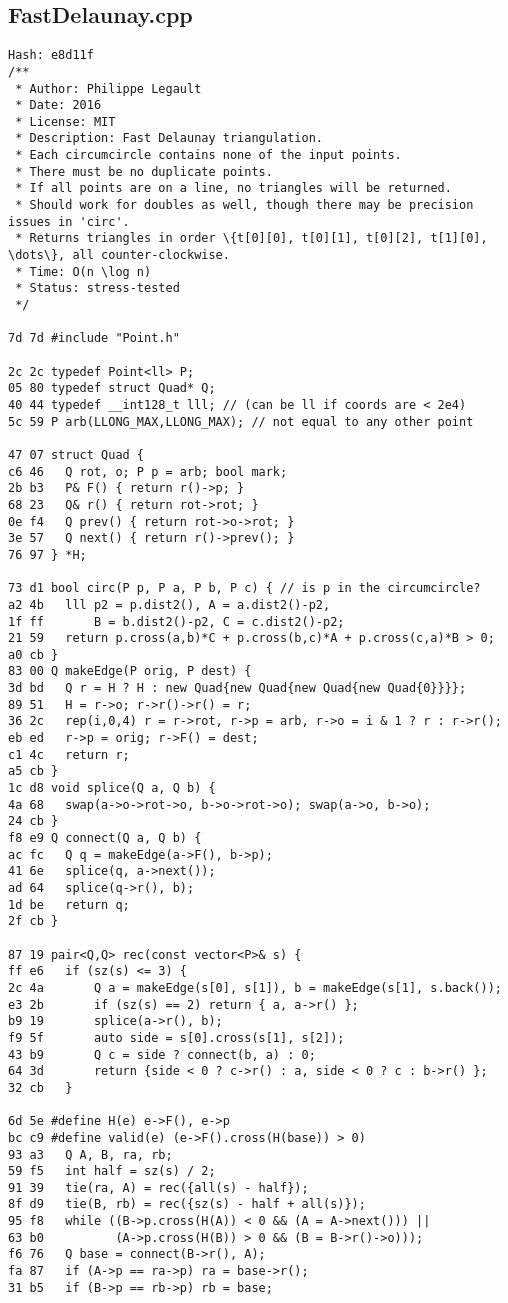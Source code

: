 \documentclass[11pt, a4paper, twoside]{article}
\begin{document}
\subsection{FastDelaunay.cpp}
\begin{lstlisting}
Hash: e8d11f
/**
 * Author: Philippe Legault
 * Date: 2016
 * License: MIT
 * Description: Fast Delaunay triangulation.
 * Each circumcircle contains none of the input points.
 * There must be no duplicate points.
 * If all points are on a line, no triangles will be returned.
 * Should work for doubles as well, though there may be precision issues in 'circ'.
 * Returns triangles in order \{t[0][0], t[0][1], t[0][2], t[1][0], \dots\}, all counter-clockwise.
 * Time: O(n \log n)
 * Status: stress-tested
 */

7d 7d #include "Point.h"

2c 2c typedef Point<ll> P;
05 80 typedef struct Quad* Q;
40 44 typedef __int128_t lll; // (can be ll if coords are < 2e4)
5c 59 P arb(LLONG_MAX,LLONG_MAX); // not equal to any other point

47 07 struct Quad {
c6 46 	Q rot, o; P p = arb; bool mark;
2b b3 	P& F() { return r()->p; }
68 23 	Q& r() { return rot->rot; }
0e f4 	Q prev() { return rot->o->rot; }
3e 57 	Q next() { return r()->prev(); }
76 97 } *H;

73 d1 bool circ(P p, P a, P b, P c) { // is p in the circumcircle?
a2 4b 	lll p2 = p.dist2(), A = a.dist2()-p2,
1f ff 	    B = b.dist2()-p2, C = c.dist2()-p2;
21 59 	return p.cross(a,b)*C + p.cross(b,c)*A + p.cross(c,a)*B > 0;
a0 cb }
83 00 Q makeEdge(P orig, P dest) {
3d bd 	Q r = H ? H : new Quad{new Quad{new Quad{new Quad{0}}}};
89 51 	H = r->o; r->r()->r() = r;
36 2c 	rep(i,0,4) r = r->rot, r->p = arb, r->o = i & 1 ? r : r->r();
eb ed 	r->p = orig; r->F() = dest;
c1 4c 	return r;
a5 cb }
1c d8 void splice(Q a, Q b) {
4a 68 	swap(a->o->rot->o, b->o->rot->o); swap(a->o, b->o);
24 cb }
f8 e9 Q connect(Q a, Q b) {
ac fc 	Q q = makeEdge(a->F(), b->p);
41 6e 	splice(q, a->next());
ad 64 	splice(q->r(), b);
1d be 	return q;
2f cb }

87 19 pair<Q,Q> rec(const vector<P>& s) {
ff e6 	if (sz(s) <= 3) {
2c 4a 		Q a = makeEdge(s[0], s[1]), b = makeEdge(s[1], s.back());
e3 2b 		if (sz(s) == 2) return { a, a->r() };
b9 19 		splice(a->r(), b);
f9 5f 		auto side = s[0].cross(s[1], s[2]);
43 b9 		Q c = side ? connect(b, a) : 0;
64 3d 		return {side < 0 ? c->r() : a, side < 0 ? c : b->r() };
32 cb 	}
      
6d 5e #define H(e) e->F(), e->p
bc c9 #define valid(e) (e->F().cross(H(base)) > 0)
93 a3 	Q A, B, ra, rb;
59 f5 	int half = sz(s) / 2;
91 39 	tie(ra, A) = rec({all(s) - half});
8f d9 	tie(B, rb) = rec({sz(s) - half + all(s)});
95 f8 	while ((B->p.cross(H(A)) < 0 && (A = A->next())) ||
63 b0 	       (A->p.cross(H(B)) > 0 && (B = B->r()->o)));
f6 76 	Q base = connect(B->r(), A);
fa 87 	if (A->p == ra->p) ra = base->r();
31 b5 	if (B->p == rb->p) rb = base;
      

\end{lstlisting}
\end{document}
